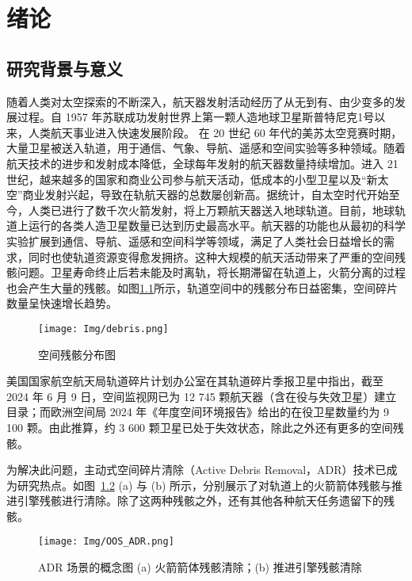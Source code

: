 \chapter{绪论}
\label{chap:intro}

\section{研究背景与意义}
随着人类对太空探索的不断深入，航天器发射活动经历了从无到有、由少变多的发展过程。自 1957 年苏联成功发射世界上第一颗人造地球卫星斯普特尼克1号以来，人类航天事业进入快速发展阶段\cite{Alpert2015}。
在 20 世纪 60 年代的美苏太空竞赛时期，大量卫星被送入轨道，用于通信、气象、导航、遥感和空间实验等多种领域。随着航天技术的进步和发射成本降低，全球每年发射的航天器数量持续增加。进入 21 世纪，越来越多的国家和商业公司参与航天活动，低成本的小型卫星以及“新太空”商业发射兴起，导致在轨航天器的总数屡创新高\cite{Kopacz2020}。据统计，自太空时代开始至今，人类已进行了数千次火箭发射，将上万颗航天器送入地球轨道。目前，地球轨道上运行的各类人造卫星数量已达到历史最高水平\cite{Pardini2021}。航天器的功能也从最初的科学实验扩展到通信、导航、遥感和空间科学等领域，满足了人类社会日益增长的需求，同时也使轨道资源变得愈发拥挤。这种大规模的航天活动带来了严重的空间残骸问题\cite{Liou2006}。卫星寿命终止后若未能及时离轨，将长期滞留在轨道上，火箭分离的过程也会产生大量的残骸。如图\ref{fig:spacedebris_distribute}所示，轨道空间中的残骸分布日益密集，空间碎片数量呈快速增长趋势\cite{Giudici2024}。
\begin{figure}[htbp]
	\centering
	\texttt{[image: Img/debris.png]}
	\caption{空间残骸分布图\cite{yalccin2022class}}
	\label{fig:spacedebris_distribute}
\end{figure}

美国国家航空航天局轨道碎片计划办公室在其轨道碎片季报卫星中指出，截至 2024 年 6 月 9 日，空间监视网已为 12 745 颗航天器（含在役与失效卫星）建立目录\cite{NASAODPO2024}；而欧洲空间局 2024 年《年度空间环境报告》给出的在役卫星数量约为 9 100 颗\cite{ESA2024}。由此推算，约 3 600 颗卫星已处于失效状态，除此之外还有更多的空间残骸。

为解决此问题，主动式空间碎片清除（Active Debris Removal，ADR）技术\cite{BARANOV2024100982,CREASER2024481,BAREA20243060,WANG2025}已成为研究热点。如图~\ref{fig:OOS_ADR} (a) 与 (b) 所示，分别展示了对轨道上的火箭箭体残骸与推进引擎残骸进行清除。除了这两种残骸之外，还有其他各种航天任务遗留下的残骸。

\begin{figure}[htbp]
	\centering
	\texttt{[image: Img/OOS\_ADR.png]}
	\caption{ADR 场景的概念图 (a) 火箭箭体残骸清除；(b) 推进引擎残骸清除}
	\label{fig:OOS_ADR}
\end{figure}


